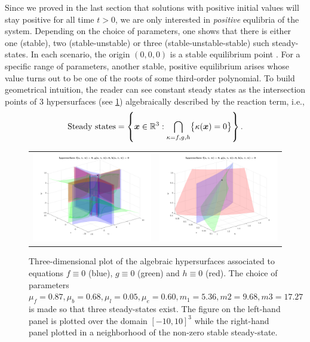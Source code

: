Since we proved in the last section that solutions with positive initial values will stay positive for all time $t>0$, we are only interested in \textit{positive} equlibria of the system. Depending on the choice of parameters, one shows that there is either one (stable), two (stable-unstable) or three (stable-unstable-stable) such steady-states. In each scenario, the origin $(0, 0, 0)$ is a stable equilibrium point . For a specific range of parameters, another stable, positive equilibrium arises whose value turns out to be one of the roots of some third-order polynomial. To build geometrical intuition, the reader can see constant steady states as the intersection points of 3 hypersurfaces (see \ref{fig:nullclines}) algebraically described by the reaction term, i.e., 
$$\text{Steady states} = \left\{\bm x \in \mathbb{R}^3 : \bigcap_{\kappa = f, g, h} \bigl\{ \kappa(\bm x) = 0 \bigr\}\right\}.$$
\begin{figure}
	\begin{tabular}{cc}
		\label{fig:nullclines}
		\includegraphics[width=0.49\linewidth]{figures/nullclines.png}
		&
		\includegraphics[width=0.49\linewidth]{figures/nullclines_zoom.png}
	\end{tabular}
\caption{Three-dimensional plot of the algebraic hypersurfaces associated to equations $f \equiv 0$ (blue), $g \equiv 0$ (green) and $h \equiv 0$ (red). The choice of parameters $\mu_f = 0.87, \mu_b = 0.68, \mu_l = 0.05, \mu_e = 0.60, m_1 = 5.36, m2 = 9.68, m3 = 17.27$ is made so that three steady-states exist. The figure on the left-hand panel is plotted over the domain $[-10, 10]^3$ while the right-hand panel plotted in a neighborhood of the non-zero stable steady-state.}
\end{figure}


